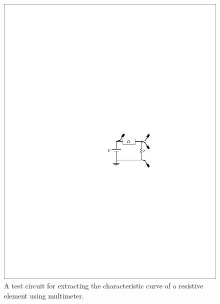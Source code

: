 \documentclass[11pt]{article}
\begin{document}
\begin{question}


    \begin{figure}[H]
        \centering
        \includegraphics[scale=1.2,angle=0]{Fig/cir2.pdf}
        \caption{A test circuit for extracting the characteristic curve of a resistive element using multimeter.} \label{fig:cir2}
    \end{figure}


\end{question}
\end{document}
